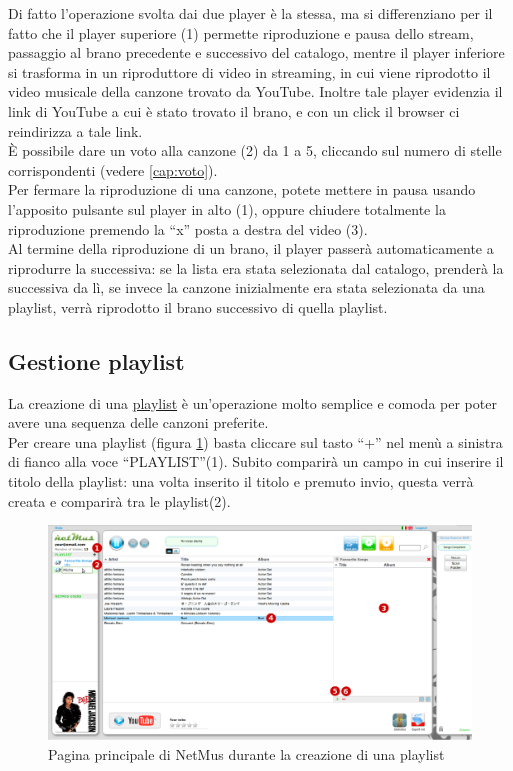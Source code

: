 Di fatto l'operazione svolta dai due player \`e la stessa, ma
si differenziano per il fatto che il player superiore (1) permette riproduzione
e pausa dello stream, passaggio al brano precedente e successivo del catalogo, mentre il player
inferiore si trasforma in un riproduttore di video in streaming, in cui viene
riprodotto il video musicale della canzone trovato da YouTube.
Inoltre tale player evidenzia il link di YouTube a cui \`e stato trovato il
brano, e con un click il browser ci reindirizza a tale link.\\
\`E possibile dare un voto alla canzone (2) da 1 a 5, cliccando sul numero di
stelle corrispondenti (vedere \ref{cap:voto}).\\

Per fermare la riproduzione di una canzone, potete mettere in pausa usando
l'apposito pulsante sul player in alto (1), oppure chiudere totalmente la
riproduzione premendo la ``x'' posta a destra del video (3).\\

Al termine della riproduzione di un brano, il player passer\`a automaticamente a
riprodurre la successiva: se la lista era stata selezionata dal catalogo,
prender\`a la successiva da l\`i, se invece la canzone inizialmente era stata
selezionata da una playlist, verr\`a riprodotto il brano successivo di quella
playlist.

\newpage
\subsection{Gestione playlist}

La creazione di una \underline{playlist} \`e un'operazione molto semplice e
comoda per poter avere una sequenza delle canzoni preferite.\\
Per creare una playlist (figura \ref{fig:playlist}) basta cliccare sul tasto
``+'' nel men\`u a sinistra di fianco alla voce ``PLAYLIST''(1). Subito comparir\`a un campo in cui
inserire il titolo della playlist: una volta inserito il titolo e premuto invio,
questa verr\`a creata e comparir\`a tra le playlist(2).\\
\begin{figure}[!htbp]
  \centering
  \includegraphics[width=14cm]{img/MU/new_playlist.png}
\caption{Pagina principale di NetMus durante la creazione di una playlist}
\label{fig:playlist}
\end{figure}
 
